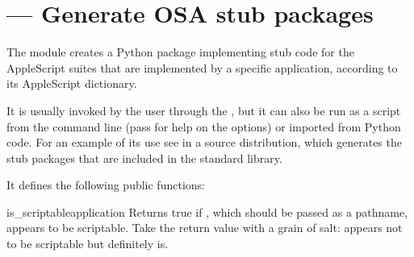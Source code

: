 \section{ ---
         Generate OSA stub packages}


The  module creates a Python package implementing
stub code for the AppleScript suites that are implemented by a specific
application, according to its AppleScript dictionary.

It is usually invoked by the user through the , but
it can also be run as a script from the command line (pass
 for help on the options) or imported from Python
code. For an example of its use see 
in a source distribution, which generates the stub packages that are
included in the standard library.

It defines the following public functions:

\begin{funcdesc}{is_scriptable}{application}
Returns true if , which should be passed as a pathname,
appears to be scriptable. Take the return value with a grain of salt:
 appears not to be scriptable but definitely is.
\end{funcdesc}

